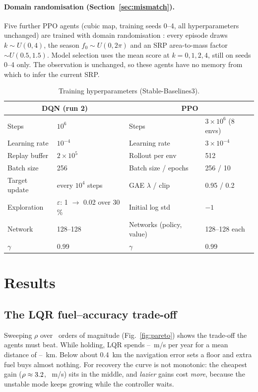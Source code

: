 \documentclass[11pt,a4paper]{article}
\begin{document}
\paragraph{Domain randomisation (Section~\ref{sec:mismatch}).} Five further
PPO agents (cubic map, training seeds 0--4, all hyperparameters unchanged) are
trained with domain randomisation \cite{tobin2017}: every episode draws
$k \sim U(0, 4)$, the season $f_0 \sim U(0, 2\pi)$ and an SRP area-to-mass
factor $\sim U(0.5, 1.5)$. Model selection uses the mean score at
$k = 0, 1, 2, 4$, still on seeds 0--4 only. The observation is unchanged, so
these agents have no memory from which to infer the current SRP.

\begin{table}[t]
\centering
\caption{Training hyperparameters (Stable-Baselines3).}
\label{tab:hyper}
\small
\begin{tabular}{ll@{\hskip 2.5em}ll}
\toprule
\multicolumn{2}{c}{DQN (run 2)} & \multicolumn{2}{c}{PPO} \\
\midrule
Steps & $10^6$ & Steps & $3\times10^6$ (8 envs) \\
Learning rate & $10^{-4}$ & Learning rate & $3\times10^{-4}$ \\
Replay buffer & $2\times10^5$ & Rollout per env & 512 \\
Batch size & 256 & Batch size / epochs & 256 / 10 \\
Target update & every $10^4$ steps & GAE $\lambda$ / clip & 0.95 / 0.2 \\
Exploration & $\varepsilon$: 1 $\to$ 0.02 over 30\,\% & Initial log std & $-1$ \\
Network & 128--128 & Networks (policy, value) & 128--128 each \\
$\gamma$ & 0.99 & $\gamma$ & 0.99 \\
\bottomrule
\end{tabular}
\end{table}

\section{Results}

\subsection{The LQR fuel--accuracy trade-off}

Sweeping $\rho$ over \rhoDecades\ orders of magnitude (Fig.~\ref{fig:pareto})
shows the trade-off the agents must beat. While holding, LQR spends
\holdDvMin--\holdDvMax~m/s per year for a mean distance of
\holdDistMax--\holdDistMin~km. Below about 0.4~km the navigation error sets a
floor and extra fuel buys almost nothing. For recovery the curve is not
monotonic: the cheapest gain ($\rho \approx 3.2$, \acqBestDv~m/s) sits
in the middle, and \emph{lazier} gains cost \emph{more}, because the unstable
mode keeps growing while the controller waits.
\end{document}
